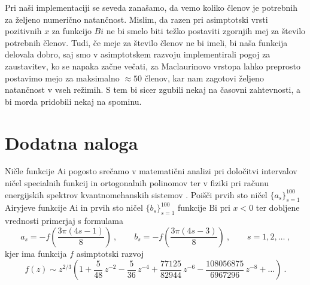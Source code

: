 \documentclass[slovene,11pt,a4paper]{article}
\newcommand{\Ai}{\mathrm{Ai}}
\newcommand{\Bi}{\mathrm{Bi}}
\begin{document}
\newpage
Pri naši implementaciji se seveda zanašamo, da vemo koliko členov je potrebnih za željeno numerično natančnost. Mislim, da razen pri asimptotski vrsti pozitivnih $x$ za funkcijo $Bi$ ne bi smelo biti težko postaviti zgornjih mej za število potrebnih členov. Tudi, če meje za število členov ne bi imeli, bi naša funkcija delovala dobro, saj smo v asimptotskem razvoju implementirali pogoj za zaustavitev, ko se napaka začne večati, za Maclaurinovo vrstopa lahko preprosto postavimo mejo za maksimalno $\approx 50$ členov, kar nam zagotovi željeno natančnost v vseh režimih. S tem bi sicer zgubili nekaj na časovni zahtevnosti, a bi morda pridobili nekaj na spominu.

\section{Dodatna naloga}

Ničle funkcije $\Ai$ pogosto srečamo v matematični
analizi pri določitvi intervalov ničel specialnih funkcij
in ortogonalnih polinomov \cite{1_szego} ter v fiziki pri računu
energijskih spektrov kvantnomehanskih sistemov \cite{1_landauQM}.
Poišči prvih sto ničel $\{a_s\}_{s=1}^{100}$ Airyjeve
funkcije $\Ai$ in prvih sto ničel $\{b_s\}_{s=1}^{100}$
funkcije $\Bi$ pri $x<0$ ter dobljene vrednosti primerjaj s formulama
%
\begin{equation*}
  a_s = - f \left( \frac{3\pi(4s-1)}{8} \right) \>, \qquad
  b_s = - f \left( \frac{3\pi(4s-3)}{8} \right) \>, \qquad s = 1,2,\ldots \>,
\end{equation*}
%
kjer ima funkcija $f$ asimptotski razvoj \cite{1_abram}
%
\begin{equation*}
  f(z) \sim z^{2/3} \left(
  1 + \frac{5}{48} \, z^{-2}
  -\frac{5}{36} \, z^{-4}
  +\frac{77125}{82944} \, z^{-6}
  -\frac{108056875}{6967296} \, z^{-8} + \ldots\right) \>.
\end{equation*}






\end{document}
